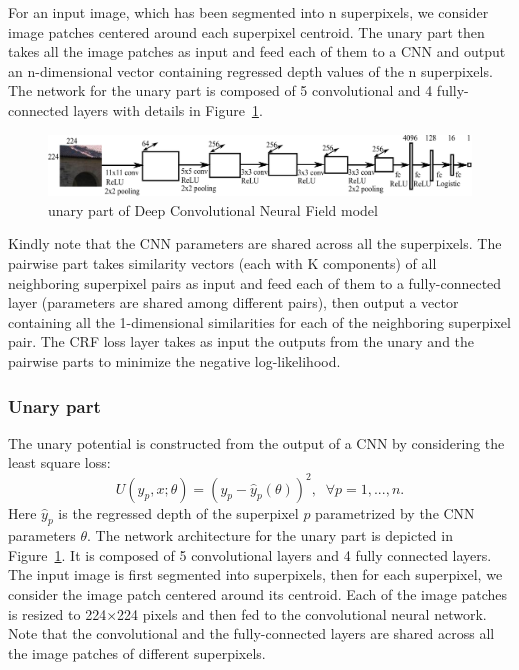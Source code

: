 \documentclass[journal]{IEEEtran}
\begin{document}
For an input image, which has been segmented into n superpixels, we 
consider image patches centered around each superpixel centroid. The unary part 
then takes all the image patches as input and feed each of them to a CNN and 
output an n-dimensional vector containing regressed depth values of the n 
superpixels. The network for the unary part is composed of 5 convolutional and 
4 fully-connected layers with details in Figure~\ref{fig:unary}. 
\begin{figure}
	\includegraphics[width=\linewidth]{../presentation/fig/cnn_unary.pdf}
	\caption{unary part of Deep Convolutional Neural Field model}
	\label{fig:unary}
\end{figure}

Kindly note that the CNN parameters are shared across all the superpixels. 
The pairwise part takes similarity vectors (each with K components) of all 
neighboring superpixel pairs as input and feed each of them to a 
fully-connected layer (parameters are shared among different pairs), then output 
a vector containing all the 1-dimensional similarities for each of the neighboring superpixel pair. The CRF loss layer takes as input the outputs from 
the unary and the pairwise parts to minimize the negative log-likelihood.
\subsubsection{Unary part}
The unary potential is constructed from the output of a CNN by considering the least square loss:
\begin{equation}\label{eq:unary}
U(y_{p}, x;\theta) = (y_p - \hat{y}_p (\theta))^2, \;\; \forall p=1,...,n.
\end{equation}
Here $\hat{y}_p$ is the regressed depth of the superpixel $p$ parametrized by 
the CNN parameters $\theta$. The network architecture for the unary part is 
depicted in Figure~\ref{fig:unary}. It is composed of 5 convolutional layers 
and 4 fully connected layers. The input image is first segmented into 
superpixels, then for each superpixel, we consider the image patch centered 
around its centroid. Each of the image patches is resized to 224×224 pixels and 
then fed to the convolutional neural network. Note that the convolutional and 
the fully-connected layers are shared across all the image patches of different 
superpixels.
\end{document}
